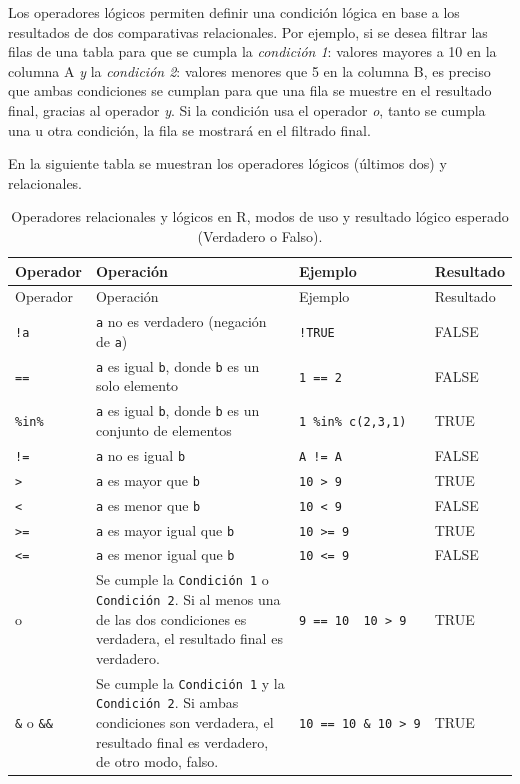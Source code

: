 \documentclass[
]{article}
\theoremstyle{definition}
\theoremstyle{definition}
\theoremstyle{definition}
\theoremstyle{definition}
\theoremstyle{remark}
\begin{document}
Los operadores lógicos permiten definir una condición lógica en base a los resultados de dos comparativas relacionales. Por ejemplo, si se desea filtrar las filas de una tabla para que se cumpla la \emph{condición 1}: valores mayores a 10 en la columna A \emph{y} la \emph{condición 2}: valores menores que 5 en la columna B, es preciso que ambas condiciones se cumplan para que una fila se muestre en el resultado final, gracias al operador \emph{y}. Si la condición usa el operador \emph{o}, tanto se cumpla una u otra condición, la fila se mostrará en el filtrado final.

En la siguiente tabla se muestran los operadores lógicos (últimos dos) y relacionales.

\begin{longtable}[]{@{}llll@{}}
\caption{\label{tab:unnamed-chunk-7}Operadores relacionales y lógicos en R, modos de uso y resultado lógico esperado (Verdadero o Falso).}\tabularnewline
\toprule()
Operador & Operación & Ejemplo & Resultado \\
\midrule()
\endfirsthead
\toprule()
Operador & Operación & Ejemplo & Resultado \\
\midrule()
\endhead
\texttt{!a} & \texttt{a} no es verdadero (negación de \texttt{a}) & \texttt{!TRUE} & FALSE \\
\texttt{==} & \texttt{a} es igual \texttt{b}, donde \texttt{b} es un solo elemento & \texttt{1\ ==\ 2} & FALSE \\
\texttt{\%in\%} & \texttt{a} es igual \texttt{b}, donde \texttt{b} es un conjunto de elementos & \texttt{1\ \%in\%\ c(2,3,1)} & TRUE \\
\texttt{!=} & \texttt{a} no es igual \texttt{b} & \texttt{A\ !=\ A} & FALSE \\
\texttt{\textgreater{}} & \texttt{a} es mayor que \texttt{b} & \texttt{10\ \textgreater{}\ 9} & TRUE \\
\texttt{\textless{}} & \texttt{a} es menor que \texttt{b} & \texttt{10\ \textless{}\ 9} & FALSE \\
\texttt{\textgreater{}=} & \texttt{a} es mayor igual que \texttt{b} & \texttt{10\ \textgreater{}=\ 9} & TRUE \\
\texttt{\textless{}=} & \texttt{a} es menor igual que \texttt{b} & \texttt{10\ \textless{}=\ 9} & FALSE \\
\texttt{\textbar{}} o \texttt{\textbar{}\textbar{}} & Se cumple la \texttt{Condición\ 1} o \texttt{Condición\ 2}. Si al menos una de las dos condiciones es verdadera, el resultado final es verdadero. & \texttt{9\ ==\ 10\ \textbar{}\ 10\ \textgreater{}\ 9} & TRUE \\
\texttt{\&} o \texttt{\&\&} & Se cumple la \texttt{Condición\ 1} y la \texttt{Condición\ 2}. Si ambas condiciones son verdadera, el resultado final es verdadero, de otro modo, falso. & \texttt{10\ ==\ 10\ \&\ 10\ \textgreater{}\ 9} & TRUE \\
\bottomrule()
\end{longtable}
\end{document}
